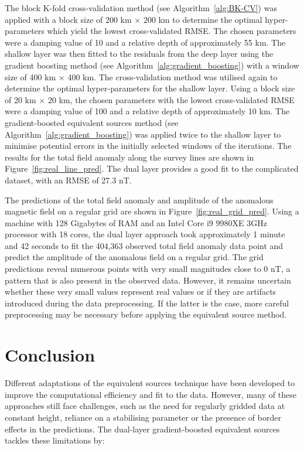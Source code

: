 The block K-fold cross-validation method (see Algorithm~\ref{alg:BK-CV}) was applied with a block size of 200 km $\times$ 200 km to determine the optimal hyper-parameters which yield the lowest cross-validated RMSE. The chosen parameters were a damping value of 10 and a relative depth of approximately 55 km. The shallow layer was then fitted to the residuals from the deep layer using the gradient boosting method (see Algorithm~\ref{alg:gradient_boosting}) with a window size of 400 km $\times$ 400 km. The cross-validation method was utilised again to determine the optimal hyper-parameters for the shallow layer. Using a block size of 20 km $\times$ 20 km, the chosen parameters with the lowest cross-validated RMSE were a damping value of 100 and a relative depth of approximately 10 km. The gradient-boosted equivalent sources method (see Algorithm~\ref{alg:gradient_boosting}) was applied twice to the shallow layer to minimise potential errors in the initially selected windows of the iterations. The results for the total field anomaly along the survey lines are shown in Figure~\ref{fig:real_line_pred}. The dual layer provides a good fit to the complicated dataset, with an RMSE of 27.3 nT.

The predictions of the total field anomaly and amplitude of the anomalous magnetic field on a regular grid are shown in Figure~\ref{fig:real_grid_pred}. Using a machine with 128 Gigabytes of RAM and an Intel Core i9 9980XE 3GHz processor with 18 cores, the dual layer approach took approximately 1 minute and 42 seconds to fit the 404,363 observed total field anomaly data point and predict the amplitude of the anomalous field on a regular grid. The grid predictions reveal numerous points with very small magnitudes close to 0 nT, a pattern that is also present in the observed data. However, it remains uncertain whether these very small values represent real values or if they are artifacts introduced during the data preprocessing. If the latter is the case, more careful preprocessing may be necessary before applying the equivalent source method.



\section{Conclusion}

Different adaptations of the equivalent sources technique have been developed to improve the computational efficiency and fit to the data. However, many of these approaches still face challenges, such as the need for regularly gridded data at constant height, reliance on a stabilising parameter or the presence of border effects in the predictions. The dual-layer gradient-boosted equivalent sources tackles these limitations by:

